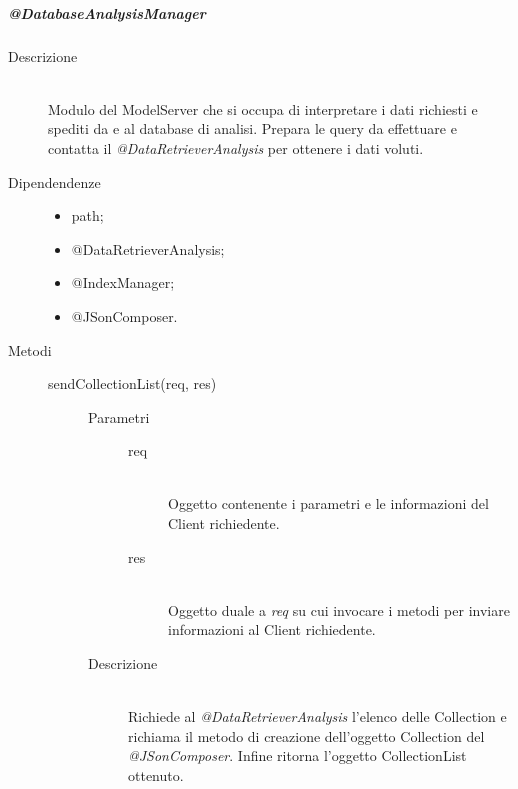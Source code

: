 \subparagraph{@DatabaseAnalysisManager}
\begin{description}
 \item[Descrizione] \hfill \\
Modulo del ModelServer che si occupa di interpretare i dati richiesti e spediti da e al database di analisi. 
Prepara le query da effettuare e contatta il \textit{@DataRetrieverAnalysis} per ottenere i dati voluti.
 \item[Dipendendenze] \hfill
 \begin{itemize}
  \item path;
  \item @DataRetrieverAnalysis;
  \item @IndexManager;
  \item @JSonComposer.
 \end{itemize}
 
 
 \item[Metodi] \hfill
 \begin{description}
 \item[sendCollectionList(req, res)] \hfill 
 \begin{description}
 \item[Parametri] \hfill
  \begin{description}
   \item[req] \hfill \\
   Oggetto contenente i parametri e le informazioni del Client richiedente.
   \item[res] \hfill \\
   Oggetto duale a \textit{req} su cui invocare i metodi per inviare informazioni al Client richiedente.
  \end{description}
 \item[Descrizione] \hfill \\
 Richiede al \textit{@DataRetrieverAnalysis} l'elenco delle Collection e richiama il metodo di creazione dell'oggetto Collection del \textit{@JSonComposer}. Infine ritorna l'oggetto CollectionList ottenuto.
 \end{description}
 

\end{description}
\end{description}
